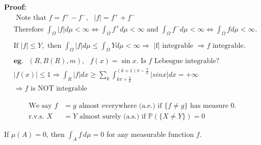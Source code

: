 \textbf{Proof:}
\begin{align*}
    & \text{ Note that } f = f^+ - f^-, \text{ } |f| = f^+ + f^-\\
    &\text{Therefore } \int_\Omega |f|d\mu < \infty \Leftrightarrow \int_\Omega f^+d\mu < \infty \text{ and } \int_\Omega f^-d\mu < \infty \Leftrightarrow \int_\Omega fd\mu < \infty.\\
    \\
    &\text{If } |f| \leq Y, \text{ then } \int_\Omega |f|d\mu \leq \int_\Omega  Y d\mu < \infty \Rightarrow \text{ |f| integrable } \Rightarrow f \text{ integrable.}\\
    \\
    &\textbf{eg.} \text{ } (R, B(R), m), \text{ } f(x) = \sin x. \text{ Is } f \text{ Lebesgue integrable?}\\
    &|f(x)| \leq 1 \Rightarrow \int_{R} |f|dx \geq \sum_k \int_{k\pi+\frac{\pi}{6}}^{(k+1)\pi-\frac{\pi}{6}} |sinx| dx =+\infty\\
    &\Rightarrow f \text{ is NOT integrable}
    \end{align*}
\begin{definition}[]{}\begin{align*}{}{}
  \text{We say } f& = g \text{ almost everywhere (a.e.) if } \{f \neq g\} \text{ has measure } 0.\\
 \text{r.v.s. } X& = Y \text{ almost surely (a.s.) if } \mathbb{P}(\{X \neq Y\}) = 0
\end{align*}
  \end{definition}
  \begin{theorem}
    If $\mu(A) = 0$, then $\int_A f \, d\mu = 0$ for any measurable function $f$.
    \end{theorem}
    
